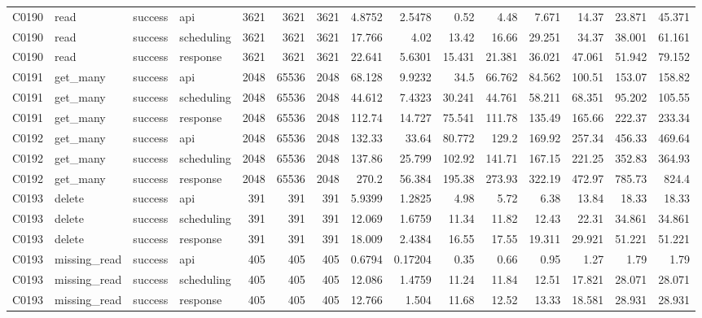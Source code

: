 \begin{landscape}
\begin{longtable}{llllrrrrrrrrrrr}
C0190 & read & success & api & 3621 & 3621 & 3621 & 4.8752 & 2.5478 & 0.52 & 4.48 & 7.671 & 14.37 & 23.871 & 45.371\\
C0190 & read & success & scheduling & 3621 & 3621 & 3621 & 17.766 & 4.02 & 13.42 & 16.66 & 29.251 & 34.37 & 38.001 & 61.161\\
C0190 & read & success & response & 3621 & 3621 & 3621 & 22.641 & 5.6301 & 15.431 & 21.381 & 36.021 & 47.061 & 51.942 & 79.152\\
C0191 & get\_\allowbreak{}many & success & api & 2048 & 65536 & 2048 & 68.128 & 9.9232 & 34.5 & 66.762 & 84.562 & 100.51 & 153.07 & 158.82\\
C0191 & get\_\allowbreak{}many & success & scheduling & 2048 & 65536 & 2048 & 44.612 & 7.4323 & 30.241 & 44.761 & 58.211 & 68.351 & 95.202 & 105.55\\
C0191 & get\_\allowbreak{}many & success & response & 2048 & 65536 & 2048 & 112.74 & 14.727 & 75.541 & 111.78 & 135.49 & 165.66 & 222.37 & 233.34\\
C0192 & get\_\allowbreak{}many & success & api & 2048 & 65536 & 2048 & 132.33 & 33.64 & 80.772 & 129.2 & 169.92 & 257.34 & 456.33 & 469.64\\
C0192 & get\_\allowbreak{}many & success & scheduling & 2048 & 65536 & 2048 & 137.86 & 25.799 & 102.92 & 141.71 & 167.15 & 221.25 & 352.83 & 364.93\\
C0192 & get\_\allowbreak{}many & success & response & 2048 & 65536 & 2048 & 270.2 & 56.384 & 195.38 & 273.93 & 322.19 & 472.97 & 785.73 & 824.4\\
C0193 & delete & success & api & 391 & 391 & 391 & 5.9399 & 1.2825 & 4.98 & 5.72 & 6.38 & 13.84 & 18.33 & 18.33\\
C0193 & delete & success & scheduling & 391 & 391 & 391 & 12.069 & 1.6759 & 11.34 & 11.82 & 12.43 & 22.31 & 34.861 & 34.861\\
C0193 & delete & success & response & 391 & 391 & 391 & 18.009 & 2.4384 & 16.55 & 17.55 & 19.311 & 29.921 & 51.221 & 51.221\\
C0193 & missing\_\allowbreak{}read & success & api & 405 & 405 & 405 & 0.6794 & 0.17204 & 0.35 & 0.66 & 0.95 & 1.27 & 1.79 & 1.79\\
C0193 & missing\_\allowbreak{}read & success & scheduling & 405 & 405 & 405 & 12.086 & 1.4759 & 11.24 & 11.84 & 12.51 & 17.821 & 28.071 & 28.071\\
C0193 & missing\_\allowbreak{}read & success & response & 405 & 405 & 405 & 12.766 & 1.504 & 11.68 & 12.52 & 13.33 & 18.581 & 28.931 & 28.931\\

\end{longtable}
\end{landscape}
